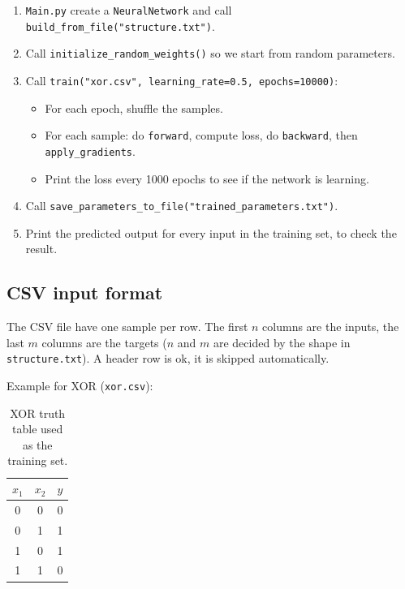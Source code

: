 \documentclass[12pt,a4paper]{article}
\begin{document}
\begin{enumerate}
    \item \texttt{Main.py} create a \texttt{NeuralNetwork} and call \texttt{build\_from\_file("structure.txt")}.
    \item Call \texttt{initialize\_random\_weights()} so we start from random parameters.
    \item Call \texttt{train("xor.csv", learning\_rate=0.5, epochs=10000)}:
    \begin{itemize}
        \item For each epoch, shuffle the samples.
        \item For each sample: do \texttt{forward}, compute loss, do \texttt{backward}, then \texttt{apply\_gradients}.
        \item Print the loss every 1000 epochs to see if the network is learning.
    \end{itemize}
    \item Call \texttt{save\_parameters\_to\_file("trained\_parameters.txt")}.
    \item Print the predicted output for every input in the training set, to check the result.
\end{enumerate}

\subsection{CSV input format}

The CSV file have one sample per row. The first $n$ columns are the inputs, the last $m$ columns are the targets ($n$ and $m$ are decided by the shape in \texttt{structure.txt}). A header row is ok, it is skipped automatically.

Example for XOR (\texttt{xor.csv}):

\begin{table}[H]
    \centering
    \begin{tabular}{|c|c|c|}
        \hline
        $x_1$ & $x_2$ & $y$ \\
        \hline
        0 & 0 & 0 \\
        0 & 1 & 1 \\
        1 & 0 & 1 \\
        1 & 1 & 0 \\
        \hline
    \end{tabular}
    \caption{XOR truth table used as the training set.}
    \label{tab:xor}
\end{table}
\end{document}

